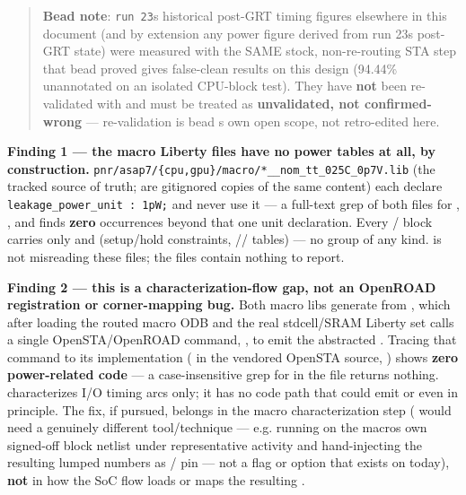 \begin{record}
\begin{quote}
\textbf{Bead  note}: \texttt{run\ 23}\textquotesingle s
historical post-GRT timing figures elsewhere in this document (and by
extension any power figure derived from run 23\textquotesingle s
post-GRT state) were measured with the SAME stock, non-re-routing STA
step that bead  proved gives false-clean results on this
design (94.44\% unannotated on an isolated CPU-block test). They have
\textbf{not} been re-validated with 
and must be treated as \textbf{unvalidated, not confirmed-wrong} ---
re-validation is bead \textquotesingle s own open scope, not
retro-edited here.
\end{quote}

\textbf{Finding 1 --- the macro Liberty files have no power tables at
all, by construction.}
\texttt{pnr/\allowbreak{}asap7/\allowbreak{}\{cpu,\allowbreak{}gpu\}/\allowbreak{}macro/\allowbreak{}*\_\allowbreak{}\_\allowbreak{}nom\_\allowbreak{}tt\_\allowbreak{}025C\_\allowbreak{}0p7V.\allowbreak{}lib}
(the tracked source of truth;  are
gitignored copies of the same content) each declare
\texttt{leakage\_\allowbreak{}power\_\allowbreak{}unit\ :\allowbreak{}\ 1pW;}
and never use it --- a full-text grep of both files for
, , and
 finds \textbf{zero} occurrences beyond that one
unit declaration. Every  /  block carries only
 and  (setup/\allowbreak{}hold
constraints, //
tables) --- no  group of any kind.  is
not misreading these files; the files contain nothing to report.

\textbf{Finding 2 --- this is a characterization-flow gap, not an
OpenROAD registration or corner-mapping bug.} Both macro libs generate
from , which after loading the
routed macro ODB and the real stdcell/\allowbreak{}SRAM Liberty set
calls a single OpenSTA/\allowbreak{}OpenROAD command,
, to emit the abstracted . Tracing
that command to its implementation ( in the
vendored OpenSTA source,
) shows
\textbf{zero power-related code} --- a case-insensitive grep for
 in the file returns nothing. 
characterizes I/O timing arcs only; it has no code path that could emit
 or  even in principle.
The fix, if pursued, belongs in the macro characterization step
( would need a genuinely different
tool/\allowbreak{}technique --- e.g. running  on the
macro\textquotesingle s own signed-off block netlist under
representative activity and hand-injecting the resulting lumped numbers
as  / pin  --- not a flag
or option that exists on  today), \textbf{not}
in how the SoC flow loads or maps the resulting .


\end{record}
